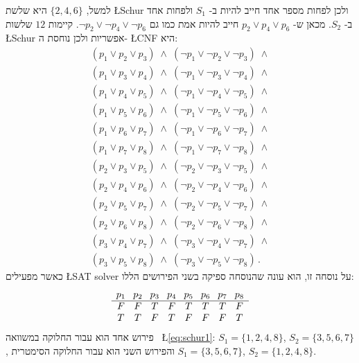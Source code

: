 למשל,
$\{2,4,6\}$
היא שלשת
\L{Schur}
ולכן לפחות מספר אחד חייב להיות ב-%
$S_1$
ולפחות אחד ב-%
$S_2$.
מכאן ש-%
$p_2 \vee p_4 \vee p_6$
חייב להיות אמת כמו גם 
$\neg p_2 \vee \neg p_4 \vee \neg p_6$.
קיימות 
$12$
שלשות 
\L{Schur}
אפשריות ולכן נוחסת ה-%
\L{CNF}
היא:
\[
\begin{array}{l}
(p_1 \vee p_2 \vee p_3) \;\wedge\; (\neg p_1 \vee \neg p_2 \vee \neg p_3) \;\wedge \\
(p_1 \vee p_3 \vee p_4) \;\wedge\; (\neg p_1 \vee \neg p_3 \vee \neg p_4) \;\wedge \\
(p_1 \vee p_4 \vee p_5) \;\wedge\; (\neg p_1 \vee \neg p_4 \vee \neg p_5) \;\wedge \\
(p_1 \vee p_5 \vee p_6) \;\wedge\; (\neg p_1 \vee \neg p_5 \vee \neg p_6) \;\wedge \\
(p_1 \vee p_6 \vee p_7) \;\wedge\; (\neg p_1 \vee \neg p_6 \vee \neg p_7) \;\wedge \\
(p_1 \vee p_7 \vee p_8) \;\wedge\; (\neg p_1 \vee \neg p_7 \vee \neg p_8) \;\wedge \\
(p_2 \vee p_3 \vee p_5) \;\wedge\; (\neg p_2 \vee \neg p_3 \vee \neg p_5) \;\wedge \\
(p_2 \vee p_4 \vee p_6) \;\wedge\; (\neg p_2 \vee \neg p_4 \vee \neg p_6) \;\wedge \\
(p_2 \vee p_5 \vee p_7) \;\wedge\; (\neg p_2 \vee \neg p_5 \vee \neg p_7) \;\wedge \\
(p_2 \vee p_6 \vee p_8) \;\wedge\; (\neg p_2 \vee \neg p_6 \vee \neg p_8) \;\wedge \\
(p_3 \vee p_4 \vee p_7) \;\wedge\; (\neg p_3 \vee \neg p_4 \vee \neg p_7) \;\wedge \\
(p_3 \vee p_5 \vee p_8) \;\wedge\; (\neg p_3 \vee \neg p_5 \vee \neg p_8)\,.
\end{array}\label{eq.schur2}
\]
כאשר מפעילים 
\L{SAT solver}
על נוסחה זו, הוא עונה שהנוסחה ספיקה בשני הפירושים הללו:
\[
\begin{array}{c@{\hspace{8pt}}c@{\hspace{8pt}}c@{\hspace{8pt}}c@{\hspace{8pt}}c@{\hspace{8pt}}c@{\hspace{8pt}}c@{\hspace{8pt}}c}
p_1&p_2&p_3&p_4&p_5&p_6&p_7&p_8\\\hline
F&F&T&F&T&T&T&F\\
T&T&F&T&F&F&F&T
\end{array}
\]
פירוש אחד הוא עבור החלוקה במשוואה%
~\L{\ref{eq:schur1}}:
$S_1=\{1,2,4,8\}$, $S_2=\{3,5,6,7\}$, 
והפירוש השני הוא עבור החלוקה הסימטרית
 $S_1=\{3,5,6,7\}$, $S_2=\{1,2,4,8\}$.

